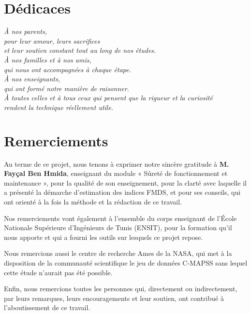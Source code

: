 \chapter*{Dédicaces}

\vspace*{2.5cm}
\begin{center}
\itshape
À nos parents,\\
pour leur amour, leurs sacrifices\\
et leur soutien constant tout au long de nos études.\\[1.4em]
À nos familles et à nos amis,\\
qui nous ont accompagnées à chaque étape.\\[1.4em]
À nos enseignants,\\
qui ont formé notre manière de raisonner.\\[1.4em]
À toutes celles et à tous ceux qui pensent que la rigueur et la curiosité\\
rendent la technique réellement utile.
\end{center}

\chapter*{Remerciements}

Au terme de ce projet, nous tenons à exprimer notre sincère gratitude à \textbf{M. Fayçal Ben Hmida}, enseignant du module « Sûreté de fonctionnement et maintenance », pour la qualité de son enseignement, pour la clarté avec laquelle il a présenté la démarche d'estimation des indices FMDS, et pour ses conseils, qui ont orienté à la fois la méthode et la rédaction de ce travail.

Nos remerciements vont également à l'ensemble du corps enseignant de l'École Nationale Supérieure d'Ingénieurs de Tunis (ENSIT), pour la formation qu'il nous apporte et qui a fourni les outils sur lesquels ce projet repose.

Nous remercions aussi le centre de recherche Ames de la NASA, qui met à la disposition de la communauté scientifique le jeu de données C-MAPSS sans lequel cette étude n'aurait pas été possible.

Enfin, nous remercions toutes les personnes qui, directement ou indirectement, par leurs remarques, leurs encouragements et leur soutien, ont contribué à l'aboutissement de ce travail.
